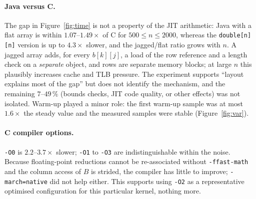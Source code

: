 \paragraph{Java versus C.} The gap in Figure~\ref{fig:time} is not a property of the JIT arithmetic: Java with a flat array is within
$1.07$--$1.49\times$ of C for $500\le n\le2000$, whereas the \texttt{double[n][n]} version is up to $4.3\times$ slower, and the
jagged/flat ratio grows with $n$. A jagged array adds, for every $b[k][j]$, a load of the row reference and a length check on a
\emph{separate} object, and rows are separate memory blocks; at large $n$ this plausibly increases cache and TLB pressure. The experiment
supports ``layout explains most of the gap'' but does not identify the mechanism, and the remaining $7$--$49\,\%$ (bounds checks,
JIT code quality, or other effects) was not isolated. Warm-up played a minor role: the first warm-up sample was at most $1.6\times$ the steady
value and the measured samples were stable (Figure~\ref{fig:var}).

\paragraph{C compiler options.} \texttt{-O0} is $2.2$--$3.7\times$ slower; \texttt{-O1} to \texttt{-O3} are indistinguishable within the noise.
Because floating-point reductions cannot be re-associated without \texttt{-ffast-math} and the column access of $B$ is strided, the
compiler has little to improve; \texttt{-march=native} did not help either. This supports using \texttt{-O2} as a representative optimised
configuration for this particular kernel, nothing more.

